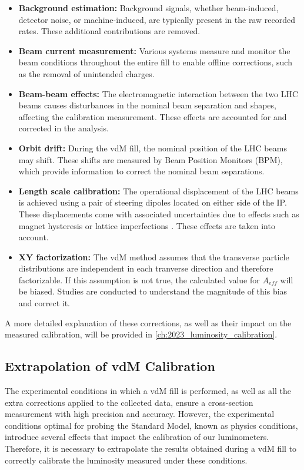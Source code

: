 \begin{itemize}
    \item \textbf{Background estimation:} Background signals, whether beam-induced, detector noise, or machine-induced, are typically present in the raw recorded rates. These additional contributions are removed.
    \item \textbf{Beam current measurement:} Various systems measure and monitor the beam conditions throughout the entire fill to enable offline corrections, such as the removal of unintended charges.
    \item \textbf{Beam-beam effects:} The electromagnetic interaction between the two LHC beams causes disturbances in the nominal beam separation and shapes, affecting the calibration measurement. These effects are accounted for and corrected in the analysis.
    \item \textbf{Orbit drift:} During the vdM fill, the nominal position of the LHC beams may shift. These shifts are measured by Beam Position Monitors (BPM), which provide information to correct the nominal beam separations.
    \item \textbf{Length scale calibration:} The operational displacement of the LHC beams is achieved using a pair of steering dipoles located on either side of the IP. These displacements come with associated uncertainties due to effects such as magnet hysteresis or lattice imperfections \cite{Persson:2750277}. These effects are taken into account.
    \item \textbf{XY factorization:} The vdM method assumes that the transverse particle distributions are independent in each tranverse direction and therefore factorizable. If this assumption is not true, the calculated value for \(A_{eff}\) will be biased. Studies are conducted to understand the magnitude of this bias and correct it.
\end{itemize}

A more detailed explanation of these corrections, as well as their impact on the measured calibration, will be provided in \autoref{ch:2023_luminosity_calibration}.

\subsection{Extrapolation of vdM Calibration}
\label{subsec:extrapolation_of_vdM_calibration}

The experimental conditions in which a vdM fill is performed, as well as all the extra corrections applied to the collected data, ensure a cross-section measurement with high precision and accuracy. However, the experimental conditions optimal for probing the Standard Model, known as physics conditions, introduce several effects that impact the calibration of our luminometers. Therefore, it is necessary to extrapolate the results obtained during a vdM fill to correctly calibrate the luminosity measured under these conditions.

